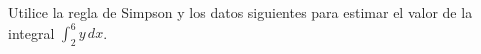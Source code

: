 \item Utilice la regla de Simpson y los datos siguientes para estimar el valor de la integral $\int_{2}^{6} y \, dx$.
